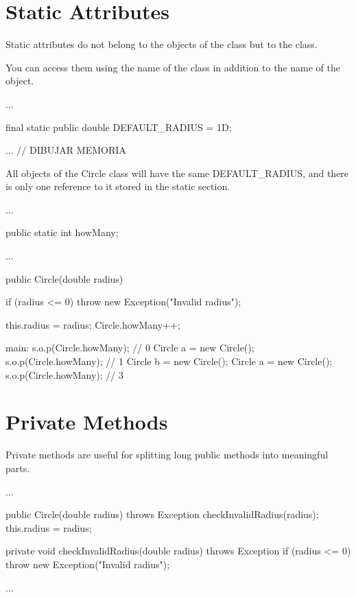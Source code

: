 \documentclass[a4paper, 9pt]{extarticle}
\begin{document}
\section{Static Attributes}

Static attributes do not belong to the objects of the class but to the class.

You can access them using the name of the class in addition to the name of the
object.

\begin{blackboard}

  ...

  final static public double DEFAULT_RADIUS = 1D;

  ...                           // DIBUJAR MEMORIA

\end{blackboard}

All objects of the Circle class will have the same DEFAULT\_RADIUS, and there is only
one reference to it stored in the static section.

\begin{blackboard}

  ...

  public static int howMany;

  ...

  public Circle(double radius) {
    if (radius <= 0) {
      throw new Exception("Invalid radius");
    }

    this.radius = radius;
    Circle.howMany++;
  }

main:
  s.o.p(Circle.howMany); // 0
  Circle a = new Circle();
  s.o.p(Circle.howMany); // 1
  Circle b = new Circle();
  Circle a = new Circle();
  s.o.p(Circle.howMany); // 3
\end{blackboard}










\section{Private Methods}

Private methods are useful for splitting long public methods into meaningful
parts.

\begin{blackboard}

  ...

  public Circle(double radius) throws Exception {
    checkInvalidRadius(radius);
    this.radius = radius;
  }

  private void checkInvalidRadius(double radius) throws Exception {
    if (radius <= 0) {
      throw new Exception("Invalid radius");
    }
  }

  ...

\end{blackboard}
\end{document}
